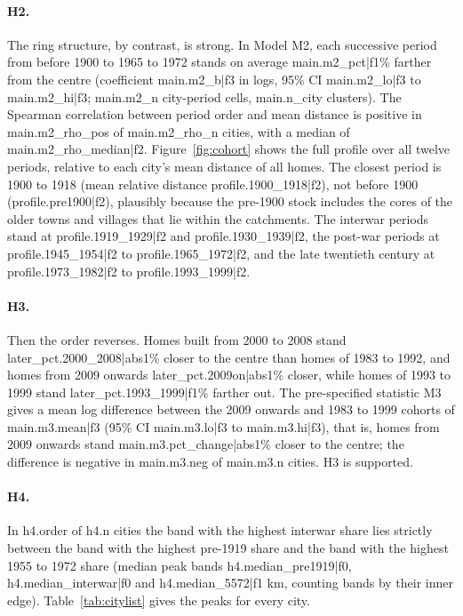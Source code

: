 \paragraph{H2.} The ring structure, by contrast, is strong. In Model M2, each successive period from before 1900 to 1965 to 1972 stands on average {{main.m2_pct|f1}}\% farther from the centre (coefficient {{main.m2_b|f3}} in logs, 95\% CI {{main.m2_lo|f3}} to {{main.m2_hi|f3}}; {{main.m2_n}} city-period cells, {{main.n_city}} clusters). The Spearman correlation between period order and mean distance is positive in {{main.m2_rho_pos}} of {{main.m2_rho_n}} cities, with a median of {{main.m2_rho_median|f2}}. Figure~\ref{fig:cohort} shows the full profile over all twelve periods, relative to each city's mean distance of all homes. The closest period is 1900 to 1918 (mean relative distance {{profile.1900_1918|f2}}), not before 1900 ({{profile.pre1900|f2}}), plausibly because the pre-1900 stock includes the cores of the older towns and villages that lie within the catchments. The interwar periods stand at {{profile.1919_1929|f2}} and {{profile.1930_1939|f2}}, the post-war periods at {{profile.1945_1954|f2}} to {{profile.1965_1972|f2}}, and the late twentieth century at {{profile.1973_1982|f2}} to {{profile.1993_1999|f2}}.

\paragraph{H3.} Then the order reverses. Homes built from 2000 to 2008 stand {{later_pct.2000_2008|abs1}}\% closer to the centre than homes of 1983 to 1992, and homes from 2009 onwards {{later_pct.2009on|abs1}}\% closer, while homes of 1993 to 1999 stand {{later_pct.1993_1999|f1}}\% farther out. The pre-specified statistic M3 gives a mean log difference between the 2009 onwards and 1983 to 1999 cohorts of {{main.m3.mean|f3}} (95\% CI {{main.m3.lo|f3}} to {{main.m3.hi|f3}}), that is, homes from 2009 onwards stand {{main.m3.pct_change|abs1}}\% closer to the centre; the difference is negative in {{main.m3.neg}} of {{main.m3.n}} cities. H3 is supported.

\paragraph{H4.} In {{h4.order}} of {{h4.n}} cities the band with the highest interwar share lies strictly between the band with the highest pre-1919 share and the band with the highest 1955 to 1972 share (median peak bands {{h4.median_pre1919|f0}}, {{h4.median_interwar|f0}} and {{h4.median_5572|f1}} km, counting bands by their inner edge). Table~\ref{tab:citylist} gives the peaks for every city.

